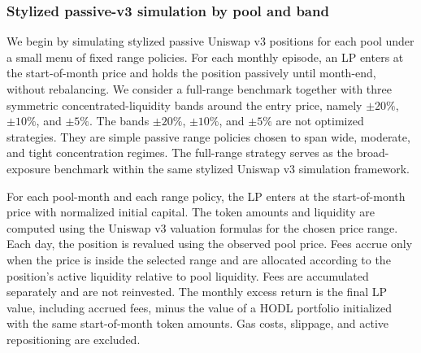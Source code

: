 \documentclass[anonymous]{lipics-v2021}
\begin{document}
{\subsubsection{Stylized passive-v3 simulation by pool and band}

We begin by simulating stylized passive Uniswap v3 positions for each pool under a small menu of fixed range policies. For each monthly episode, an LP enters at the start-of-month price and holds the position passively until month-end, without rebalancing. We consider a full-range benchmark together with three symmetric concentrated-liquidity bands around the entry price, namely $\pm20\%$, $\pm10\%$, and $\pm5\%$. The bands $\pm20\%$, $\pm10\%$, and $\pm5\%$ are not optimized strategies. They are simple passive range policies chosen to span wide, moderate, and tight concentration regimes. The full-range strategy serves as the broad-exposure benchmark within the same stylized Uniswap v3 simulation framework.

For each pool-month and each range policy, the LP enters at the start-of-month price with normalized initial capital. The token amounts and liquidity are computed using the Uniswap v3 valuation formulas for the chosen price range. Each day, the position is revalued using the observed pool price. Fees accrue only when the price is inside the selected range and are allocated according to the position's active liquidity relative to pool liquidity. Fees are accumulated separately and are not reinvested. The monthly excess return is the final LP value, including accrued fees, minus the value of a HODL portfolio initialized with the same start-of-month token amounts. Gas costs, slippage, and active repositioning are excluded.



}
\end{document}
